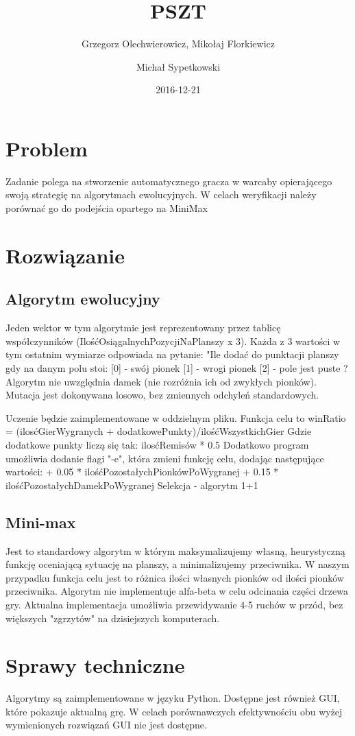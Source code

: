 \documentclass{article}
\title{PSZT}
\date{2016-12-21}
\author{Grzegorz Olechwierowicz, Mikołaj Florkiewicz\and Michał Sypetkowski}
\begin{document}
\maketitle
{}
\newpage
{}
\section{Problem}

Zadanie polega na stworzenie automatycznego gracza w warcaby opierającego swoją strategię
na algorytmach ewolucyjnych. W celach weryfikacji należy porównać go do podejścia
opartego na MiniMax

\section{Rozwiązanie}

\subsection{Algorytm ewolucyjny}

Jeden wektor w tym algorytmie jest reprezentowany przez tablicę współczynników (IlośćOsiągalnychPozycjiNaPlanszy x 3).
Każda z 3 wartości w tym ostatnim wymiarze odpowiada na pytanie: "Ile dodać do punktacji planszy gdy na danym polu stoi:
[0] - swój pionek
[1] - wrogi pionek
[2] - pole jest puste ?
Algorytm nie uwzględnia damek (nie rozróżnia ich od zwykłych pionków).
Mutacja jest dokonywana losowo, bez zmiennych odchyleń standardowych.

Uczenie będzie zaimplementowane w oddzielnym pliku.
Funkcja celu to winRatio = (ilosćGierWygranych + dodatkowePunkty)/ilośćWszystkichGier
Gdzie dodatkowe punkty liczą się tak:
ilosćRemisów * 0.5
Dodatkowo program umożliwia dodanie flagi "-e", która zmieni funkcję celu, dodając następujące wartości:
+ 0.05 * ilośćPozostałychPionkówPoWygranej
+ 0.15 * ilośćPozostałychDamekPoWygranej
Selekcja - algorytm 1+1 

\subsection{Mini-max}

Jest to standardowy algorytm w którym maksymalizujemy własną, heurystyczną funkcję oceniającą sytuację na planszy, a minimalizujemy przeciwnika. W naszym przypadku funkcja celu jest to różnica ilości własnych pionków od ilości pionków przeciwnika. Algorytm nie implementuje alfa-beta w celu odcinania części drzewa gry. Aktualna implementacja umożliwia przewidywanie 4-5 ruchów w przód, bez większych "zgrzytów" na dzisiejszych komputerach. 

\section{Sprawy techniczne}

Algorytmy są zaimplementowane w języku Python. Dostępne jest również GUI, które pokazuje aktualną grę. W celach porównawczych efektywnościu obu wyżej wymienionych rozwiązań GUI nie jest dostępne.   
\end{document}
